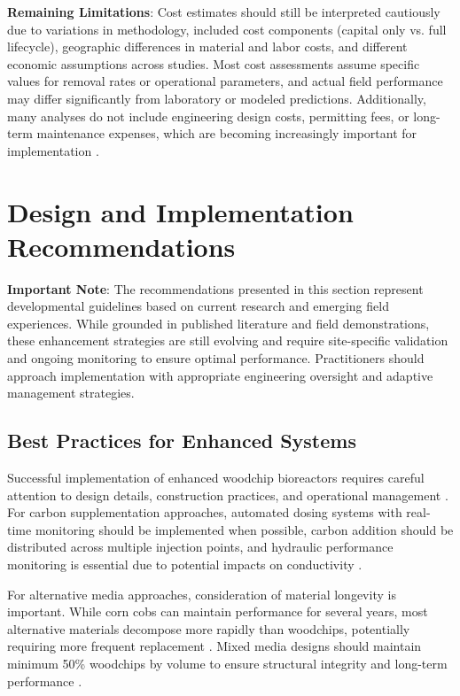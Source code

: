 \documentclass[12pt,a4paper]{article}
\begin{document}
\textbf{Remaining Limitations}: Cost estimates should still be interpreted cautiously due to variations in methodology, included cost components (capital only vs. full lifecycle), geographic differences in material and labor costs, and different economic assumptions across studies. Most cost assessments assume specific values for removal rates or operational parameters, and actual field performance may differ significantly from laboratory or modeled predictions. Additionally, many analyses do not include engineering design costs, permitting fees, or long-term maintenance expenses, which are becoming increasingly important for implementation \citep{RN289}.

\section{Design and Implementation Recommendations}

\textbf{Important Note}: The recommendations presented in this section represent developmental guidelines based on current research and emerging field experiences. While grounded in published literature and field demonstrations, these enhancement strategies are still evolving and require site-specific validation and ongoing monitoring to ensure optimal performance. Practitioners should approach implementation with appropriate engineering oversight and adaptive management strategies.

\subsection{Best Practices for Enhanced Systems}

Successful implementation of enhanced woodchip bioreactors requires careful attention to design details, construction practices, and operational management \citep{RN310, RN312}. For carbon supplementation approaches, automated dosing systems with real-time monitoring should be implemented when possible, carbon addition should be distributed across multiple injection points, and hydraulic performance monitoring is essential due to potential impacts on conductivity \citep{RN632}.

For alternative media approaches, consideration of material longevity is important. While corn cobs can maintain performance for several years, most alternative materials decompose more rapidly than woodchips, potentially requiring more frequent replacement \citep{RN350, RN624}. Mixed media designs should maintain minimum 50\% woodchips by volume to ensure structural integrity and long-term performance \citep{RN350}.
\end{document}
